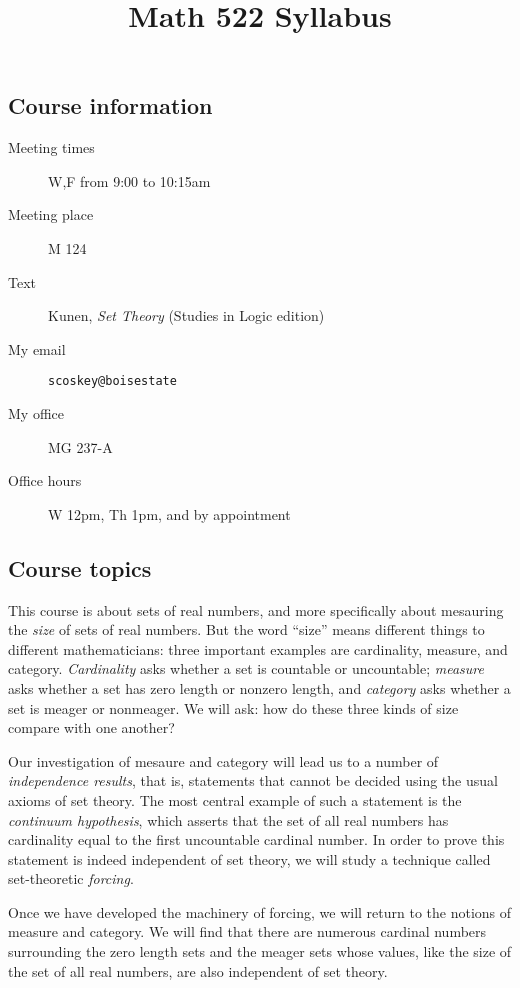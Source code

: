 \documentclass[12pt,oneside]{amsart}
\title{Math 522 Syllabus}
\begin{document}
\maketitle
\thispagestyle{empty}

\subsection*{Course information}
\begin{description}
\item[Meeting times] W,F from 9:00 to 10:15am
\item[Meeting place] M 124
\item[Text] Kunen, \emph{Set Theory} (Studies in Logic edition)
\item[My email] \texttt{scoskey@boisestate}
\item[My office] MG 237-A
\item[Office hours] W 12pm, Th 1pm, and by appointment
\end{description}

\subsection*{Course topics}

This course is about sets of real numbers, and more specifically about mesauring the \emph{size} of sets of real numbers. But the word ``size'' means different things to different mathematicians: three important examples are cardinality, measure, and category. \emph{Cardinality} asks whether a set is countable or uncountable; \emph{measure} asks whether a set has zero length or nonzero length, and \emph{category} asks whether a set is meager or nonmeager. We will ask: how do these three kinds of size compare with one another?

Our investigation of mesaure and category will lead us to a number of \emph{independence results}, that is, statements that cannot be decided using the usual axioms of set theory. The most central example of such a statement is the \emph{continuum hypothesis}, which asserts that the set of all real numbers has cardinality equal to the first uncountable cardinal number. In order to prove this statement is indeed independent of set theory, we will study a technique called set-theoretic \emph{forcing}.

Once we have developed the machinery of forcing, we will return to the notions of measure and category. We will find that there are numerous cardinal numbers surrounding the zero length sets and the meager sets whose values, like the size of the set of all real numbers, are also independent of set theory.
\end{document}

